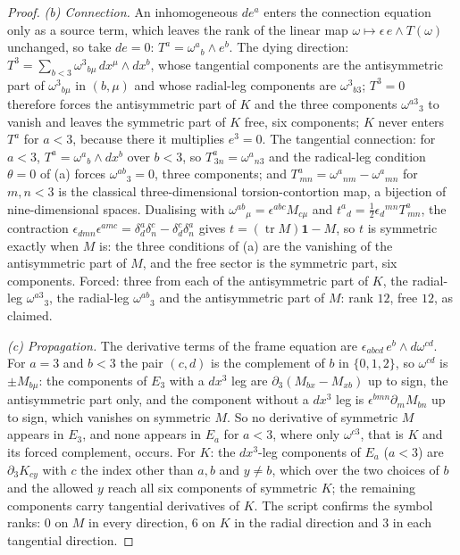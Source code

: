 \documentclass[11pt]{article}
\theoremstyle{definition}
\theoremstyle{plain}
\begin{document}
\begin{proof}
\emph{(b) Connection.} An inhomogeneous $de^a$ enters the connection equation only as a source term, which leaves the rank of the linear map $\omega \mapsto \epsilon\,e\wedge T(\omega)$ unchanged, so take $de = 0$: $T^a = \omega^{a}{}_{b}\wedge e^b$. The dying direction: $T^3 = \sum_{b<3}\omega^{3}{}_{b\mu}\,dx^\mu\wedge dx^b$, whose tangential components are the antisymmetric part of $\omega^{3}{}_{b\mu}$ in $(b,\mu)$ and whose radial-leg components are $\omega^{3}{}_{b3}$; $T^3 = 0$ therefore forces the antisymmetric part of $K$ and the three components $\omega^{a3}{}_{3}$ to vanish and leaves the symmetric part of $K$ free, six components; $K$ never enters $T^a$ for $a < 3$, because there it multiplies $e^3 = 0$. The tangential connection: for $a < 3$, $T^a = \omega^{a}{}_{b}\wedge dx^b$ over $b < 3$, so $T^a_{\,3n} = \omega^{a}{}_{n3}$ and the radical-leg condition $\theta = 0$ of (a) forces $\omega^{ab}{}_{3} = 0$, three components; and $T^a_{\,mn} = \omega^{a}{}_{nm} - \omega^{a}{}_{mn}$ for $m,n < 3$ is the classical three-dimensional torsion-contortion map, a bijection of nine-dimensional spaces. Dualising with $\omega^{ab}{}_{\mu} = \epsilon^{abc}M_{c\mu}$ and $t^{a}{}_{d} = \tfrac12\epsilon_{d}{}^{mn}T^a_{\,mn}$, the contraction $\epsilon_{dmn}\epsilon^{amc} = \delta^a_d\delta^c_n - \delta^c_d\delta^a_n$ gives $t = (\operatorname{tr}M)\mathbf{1} - M$, so $t$ is symmetric exactly when $M$ is: the three conditions of (a) are the vanishing of the antisymmetric part of $M$, and the free sector is the symmetric part, six components. Forced: three from each of the antisymmetric part of $K$, the radial-leg $\omega^{a3}{}_{3}$, the radial-leg $\omega^{ab}{}_{3}$ and the antisymmetric part of $M$: rank $12$, free $12$, as claimed.

\emph{(c) Propagation.} The derivative terms of the frame equation are $\epsilon_{abcd}\,e^b\wedge d\omega^{cd}$. For $a = 3$ and $b < 3$ the pair $(c,d)$ is the complement of $b$ in $\{0,1,2\}$, so $\omega^{cd}$ is $\pm M_{b\mu}$: the components of $E_3$ with a $dx^3$ leg are $\partial_3(M_{bx} - M_{xb})$ up to sign, the antisymmetric part only, and the component without a $dx^3$ leg is $\epsilon^{bmn}\partial_m M_{bn}$ up to sign, which vanishes on symmetric $M$. So no derivative of symmetric $M$ appears in $E_3$, and none appears in $E_a$ for $a < 3$, where only $\omega^{c3}$, that is $K$ and its forced complement, occurs. For $K$: the $dx^3$-leg components of $E_a$ ($a < 3$) are $\partial_3 K_{c y}$ with $c$ the index other than $a, b$ and $y \neq b$, which over the two choices of $b$ and the allowed $y$ reach all six components of symmetric $K$; the remaining components carry tangential derivatives of $K$. The script confirms the symbol ranks: $0$ on $M$ in every direction, $6$ on $K$ in the radial direction and $3$ in each tangential direction.


\end{proof}
\end{document}
